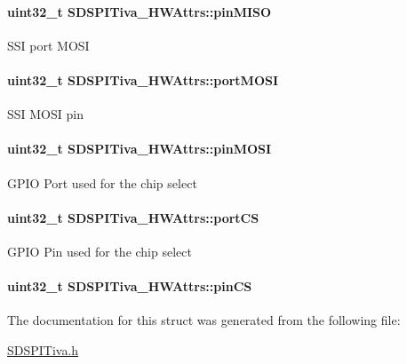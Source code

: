 \paragraph[{pin\-M\-I\-S\-O}]{\setlength{\rightskip}{0pt plus 5cm}uint32\-\_\-t S\-D\-S\-P\-I\-Tiva\-\_\-\-H\-W\-Attrs\-::pin\-M\-I\-S\-O}\label{struct_s_d_s_p_i_tiva___h_w_attrs_a4f9e453efc436b6085d60958c4e35621}
S\-S\-I port M\-O\-S\-I 
\paragraph[{port\-M\-O\-S\-I}]{\setlength{\rightskip}{0pt plus 5cm}uint32\-\_\-t S\-D\-S\-P\-I\-Tiva\-\_\-\-H\-W\-Attrs\-::port\-M\-O\-S\-I}\label{struct_s_d_s_p_i_tiva___h_w_attrs_ab3777b1b021adab95b084a184c52190c}
S\-S\-I M\-O\-S\-I pin 
\paragraph[{pin\-M\-O\-S\-I}]{\setlength{\rightskip}{0pt plus 5cm}uint32\-\_\-t S\-D\-S\-P\-I\-Tiva\-\_\-\-H\-W\-Attrs\-::pin\-M\-O\-S\-I}\label{struct_s_d_s_p_i_tiva___h_w_attrs_a9cd1616a8428a2a12986a77d43b74870}
G\-P\-I\-O Port used for the chip select 
\paragraph[{port\-C\-S}]{\setlength{\rightskip}{0pt plus 5cm}uint32\-\_\-t S\-D\-S\-P\-I\-Tiva\-\_\-\-H\-W\-Attrs\-::port\-C\-S}\label{struct_s_d_s_p_i_tiva___h_w_attrs_a280c343673240705674b67fd32c4affc}
G\-P\-I\-O Pin used for the chip select 
\paragraph[{pin\-C\-S}]{\setlength{\rightskip}{0pt plus 5cm}uint32\-\_\-t S\-D\-S\-P\-I\-Tiva\-\_\-\-H\-W\-Attrs\-::pin\-C\-S}\label{struct_s_d_s_p_i_tiva___h_w_attrs_a50cd7f2bd849a73e055283d3a302f3fe}


The documentation for this struct was generated from the following file\-:\begin{DoxyCompactItemize}
\item 
\hyperlink{_s_d_s_p_i_tiva_8h}{S\-D\-S\-P\-I\-Tiva.\-h}\end{DoxyCompactItemize}
